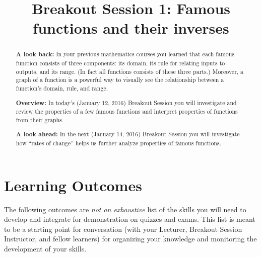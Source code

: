 \documentclass[handout]{ximera}
\title{Breakout Session 1: Famous functions and their inverses}
\begin{document}
\begin{abstract}
  
  \textbf{A look back:} In your previous mathematics courses you learned that each famous function consists of three components: its domain, its rule for relating inputs to outputs, and its range.
  (In fact all functions consists of these three parts.)
  Moreover, a graph of a function is a powerful way to visually see the relationship between a function's domain, rule, and range.

  \textbf{Overview:} In today's (January 12, 2016) Breakout Session you will investigate and review the properties of a few famous functions and interpret properties of functions from their graphs.

  \textbf{A look ahead:} In the next (January 14, 2016) Breakout Session you will investigate how ``rates of change'' helps us further analyze properties of famous functions.
\end{abstract}
\maketitle

\section{Learning Outcomes}
The following outcomes are \emph{not an exhaustive} list of the skills you will need to develop and integrate for demonstration on quizzes and exams.
This list is meant to be a starting point for conversation (with your Lecturer, Breakout Session Instructor, and fellow learners) for organizing your knowledge and monitoring the development of your skills.
\end{document}
